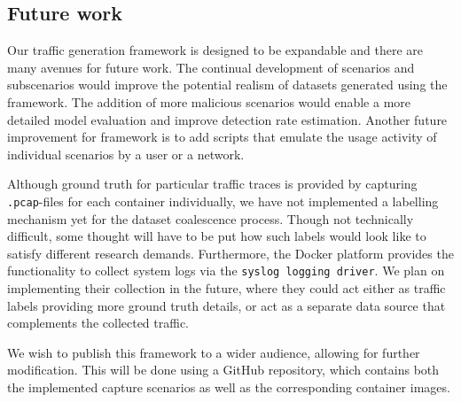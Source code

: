 \subsection{Future work}

Our traffic generation framework is designed to be expandable and there are many avenues for future work. The continual development of scenarios and subscenarios would improve the potential realism of datasets generated using the framework. The addition of more malicious scenarios would enable a more detailed model evaluation and improve detection rate estimation. 
Another future improvement for framework is to add scripts that emulate the usage activity of individual scenarios by a user or a network. 


Although ground truth for particular traffic traces is provided by capturing \texttt{.pcap}-files for each container individually, we have not implemented a labelling mechanism yet for the dataset coalescence process. Though not technically difficult, some thought will have to be put how such labels would look like to satisfy different research demands.
Furthermore, the Docker platform provides the functionality to collect system logs via the \texttt{syslog logging driver}. We plan on implementing their collection in the future, where they could act either as traffic labels providing more ground truth details, or act as a separate data source that complements the collected traffic.

We wish to publish this framework to a wider audience, allowing for further modification. This will be done using a GitHub repository, which contains both the implemented capture scenarios as well as the corresponding container images.

